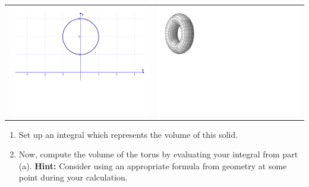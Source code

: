 \documentclass[12pt]{article}
\newif\ifans
\begin{document}
\begin{enumerate}
\begin{center}
\begin{tabular}{cc}
\includegraphics[scale=0.4]{circle.pdf}&\includegraphics[scale=.7]{torus.pdf}
\end{tabular}
\end{center}

\begin{enumerate}

\item  Set up an integral which represents the volume of this solid.

\ifans{\fbox{$V=\pi \int_{-1}^1 \left(\left(\sqrt{1-x^2}+2\right)^2-\left(2-\sqrt{1-x^2}\right)^2\right)\,dx=8\pi\int_{-1}^1 \sqrt{1-x^2} \,dx$}} \fi

\item Now, compute the volume of the torus by evaluating your integral from part (a).  {\bf Hint:} Consider using an appropriate formula from geometry at some point during your calculation.

\ifans{\fbox{$4\pi^2$}} \fi

\end{enumerate}

\end{enumerate}
\end{document}
